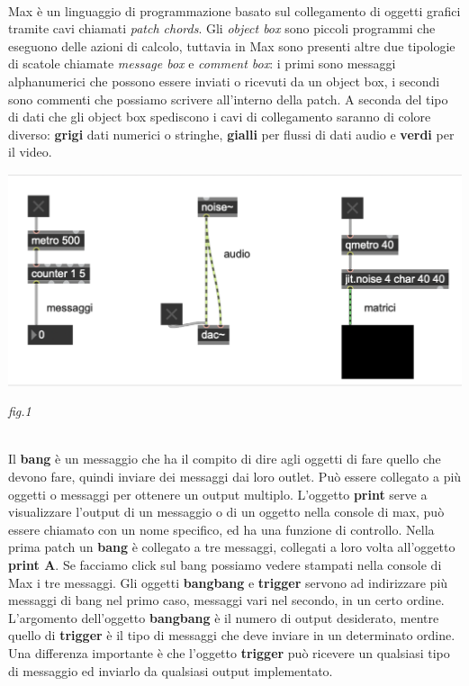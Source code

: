 \documentclass[11pt]{article}
\begin{document}
\begin{multicols*}{2}
\parskip=0pt

\textbf{}\\

\noindent Max è un linguaggio di programmazione basato sul collegamento di oggetti grafici tramite cavi chiamati \textit {patch chords}. Gli \textit{object box} sono piccoli programmi che eseguono delle azioni di calcolo, tuttavia in Max sono presenti altre due tipologie di scatole chiamate \textit{message box} e \textit{comment box}: i primi sono messaggi alphanumerici che possono essere inviati o ricevuti da un object box, i secondi sono commenti che possiamo scrivere all’interno della patch.
A seconda del tipo di dati che gli object box spediscono i cavi di collegamento saranno di colore diverso: \textbf{grigi} dati numerici o stringhe, \textbf{gialli} per flussi di dati audio e \textbf{verdi} per il video.\\

\begin{center}
\includegraphics[scale=0.3]{images/01patchcords.png}

{\scriptsize \emph{fig.1 }}
\end{center}

\textbf{}\\

\noindent Il \textbf{bang} è un messaggio che ha il compito di dire agli oggetti di fare quello che devono fare, quindi inviare dei messaggi dai loro outlet. Può essere collegato a più oggetti o messaggi per ottenere un output multiplo.
L’oggetto \textbf{print} serve a visualizzare l’output di un messaggio o di un oggetto nella console di max, può essere chiamato con un nome specifico, ed ha una funzione di controllo.
Nella prima patch un \textbf{bang} è collegato a tre messaggi, collegati a loro volta all’oggetto \textbf{print A}. Se facciamo click sul bang possiamo vedere stampati nella console di Max i tre messaggi.
Gli oggetti \textbf{bangbang} e \textbf{trigger} servono ad indirizzare più messaggi di bang nel primo caso, messaggi vari nel secondo, in un certo ordine. L’argomento dell’oggetto \textbf{bangbang} è il numero di output desiderato, mentre quello di \textbf{trigger} è il tipo di messaggi che deve inviare in un determinato ordine. Una differenza importante è che l’oggetto \textbf{trigger} può ricevere un qualsiasi tipo di messaggio ed inviarlo da qualsiasi output implementato.\\


\end{multicols*}
\end{document}
